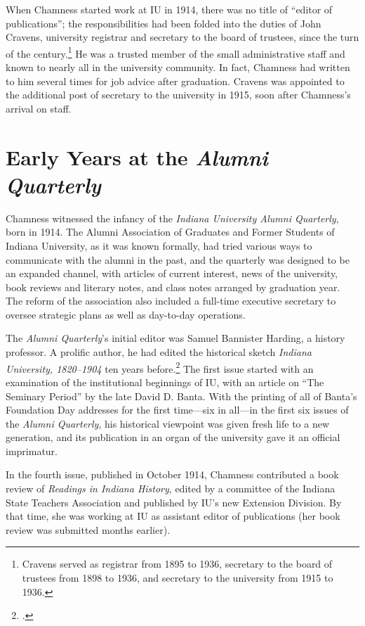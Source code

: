 \documentclass[
  american,
  letterpaper,
]{scrreprt}
\begin{document}
When Chamness started work at IU in 1914, there was no title of ``editor
of publications''; the responsibilities had been folded into the duties
of John Cravens, university registrar and secretary to the board of
trustees, since the turn of the century.\footnote{Cravens served as
  registrar from 1895 to 1936, secretary to the board of trustees from
  1898 to 1936, and secretary to the university from 1915 to 1936.} He
was a trusted member of the small administrative staff and known to
nearly all in the university community. In fact, Chamness had written to
him several times for job advice after graduation. Cravens was appointed
to the additional post of secretary to the university in 1915, soon
after Chamness's arrival on staff.

\section{\texorpdfstring{Early Years at the \emph{Alumni
Quarterly}}{Early Years at the Alumni Quarterly}}\label{early-years-at-the-alumni-quarterly}

Chamness witnessed the infancy of the \emph{Indiana University Alumni
Quarterly}, born in 1914. The Alumni Association of Graduates and Former
Students of Indiana University, as it was known formally, had tried
various ways to communicate with the alumni in the past, and the
quarterly was designed to be an expanded channel, with articles of
current interest, news of the university, book reviews and literary
notes, and class notes arranged by graduation year. The reform of the
association also included a full-time executive secretary to oversee
strategic plans as well as day-to-day operations.

The \emph{Alumni Quarterly}'s initial editor was Samuel Bannister
Harding, a history professor. A prolific author, he had edited the
historical sketch \emph{Indiana University, 1820--1904} ten years
before.\footnote{.} The first issue started with an examination of the
institutional beginnings of IU, with an article on ``The Seminary
Period'' by the late David D. Banta. With the printing of all of Banta's
Foundation Day addresses for the first time---six in all---in the first
six issues of the \emph{Alumni Quarterly}, his historical viewpoint was
given fresh life to a new generation, and its publication in an organ of
the university gave it an official imprimatur.

In the fourth issue, published in October 1914, Chamness contributed a
book review of \emph{Readings in Indiana History}, edited by a committee
of the Indiana State Teachers Association and published by IU's new
Extension Division. By that time, she was working at IU as assistant
editor of publications (her book review was submitted months earlier).
\end{document}
